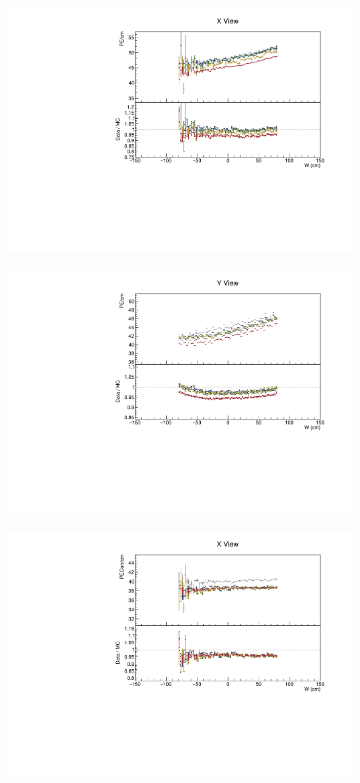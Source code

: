 \documentclass[12pt,a4paper]{article}
\begin{document}
\begin{figure}[!ht]
  \begin{subfigure}{0.5\textwidth}
    \includegraphics[width=\linewidth]{essentialsec_tb/pecm_w_x.pdf}
  \end{subfigure}
  \begin{subfigure}{0.5\textwidth}
    \includegraphics[width=\linewidth]{essentialsec_tb/pecm_w_y.pdf}
  \end{subfigure}
  \begin{subfigure}{0.5\textwidth}
    \includegraphics[width=\linewidth]{essentialsec_tb/pecorrcm_w_x.pdf}

\end{subfigure}
\end{figure}
\end{document}
